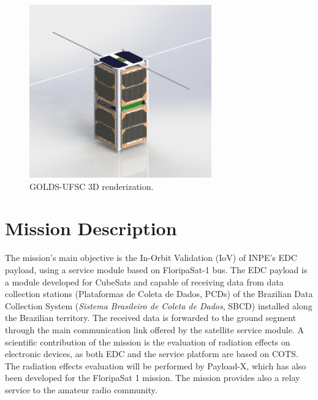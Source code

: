 \begin{figure}[!ht]
    \begin{center}
        \includegraphics[width=0.7\textwidth]{figures/floripasat-2.jpg}
        \caption{GOLDS-UFSC 3D renderization.}
        \label{fig:GOLDS-UFSC-render}
    \end{center}
\end{figure}

\section{Mission Description}
The mission's main objective is the In-Orbit Validation (IoV) of INPE's EDC payload, using a service module based on FloripaSat-1 bus. The EDC payload is a module developed for CubeSats and capable of receiving data from data collection stations (Plataformas de Coleta de Dados, PCDs) of the Brazilian Data Collection System (\textit{Sistema Brasileiro de Coleta de Dados}, SBCD) installed along the Brazilian territory. The received data is forwarded to the ground segment through the main communication link offered by the satellite service module. A scientific contribution of the mission is the evaluation of radiation effects on electronic devices, as both EDC and the service platform are based on COTS. The radiation effects evaluation will be performed by Payload-X, which has also been developed for the FloripaSat 1 mission. The mission provides also a relay service to the amateur radio community.


